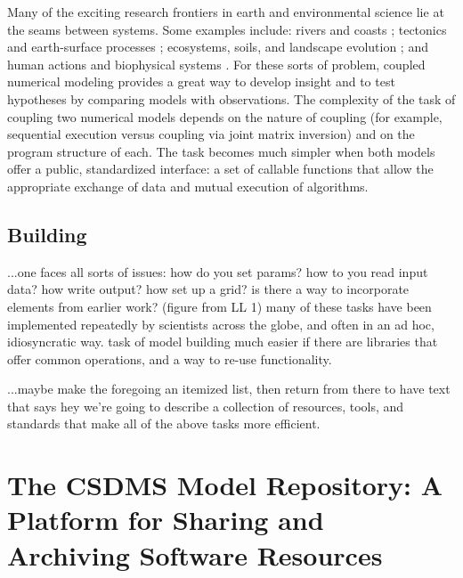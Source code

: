 \documentclass[12pt]{amsart}
\begin{document}
Many of the exciting research frontiers in earth and environmental science lie at the seams between systems. Some examples include: rivers and coasts \citep[e.g.,][]{ratliff2018exploring}; tectonics and earth-surface processes \citep[e.g.,][]{roy2016dynamic}; ecosystems, soils, and landscape evolution \citep[e.g.,][]{istanbulluoglu2005vegetation,pelletier2017way,lyons2020speciesevolver}; and human actions and biophysical systems \citep[e.g.,][]{robinson2018modelling}. For these sorts of problem, coupled numerical modeling provides a great way to develop insight and to test hypotheses by comparing models with observations. The complexity of the task of coupling two numerical models depends on the nature of coupling (for example, sequential execution versus coupling via joint matrix inversion) and on the program structure of each. The task becomes much simpler when both models offer a public, standardized interface: a set of callable functions that allow the appropriate exchange of data and mutual execution of algorithms.

\subsection{Building}\label{sec:build}
...one faces all sorts of issues: how do you set params? how to you read input data? how write output? how set up a grid? is there a way to incorporate elements from earlier work? (figure from LL 1) many of these tasks have been implemented repeatedly by scientists across the globe, and often in an ad hoc, idiosyncratic way. task of model building much easier if there are libraries that offer common operations, and a way to re-use functionality.

...maybe make the foregoing an itemized list, then return from there to have text that says hey we're going to describe a collection of resources, tools, and standards that make all of the above tasks more efficient.


\section{The CSDMS Model Repository: A Platform for Sharing and Archiving Software Resources}
\end{document}
